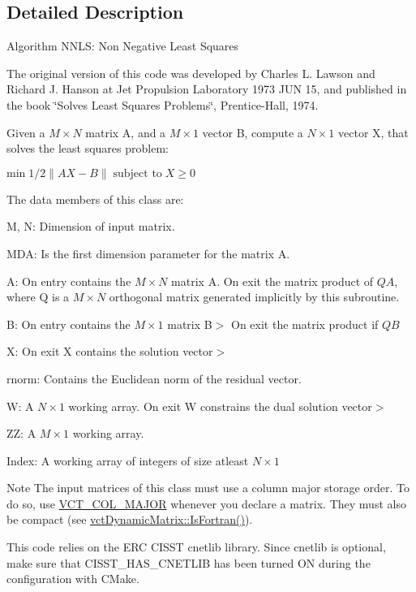 \subsection{Detailed Description}
Algorithm N\-N\-L\-S\-: Non Negative Least Squares

The original version of this code was developed by Charles L. Lawson and Richard J. Hanson at Jet Propulsion Laboratory 1973 J\-U\-N 15, and published in the book \char`\"{}\-Solves Least Squares Problems\char`\"{}, Prentice-\/\-Hall, 1974.

Given a $ M \times N$ matrix A, and a $ M \times 1 $ vector B, compute a $ N \times 1 $ vector X, that solves the least squares problem\-:

$ \mbox{min} \; 1 / 2 \| AX - B \| \; \mbox{subject to} \; X \geq 0$

The data members of this class are\-:
\begin{DoxyItemize}
\item M, N\-: Dimension of input matrix.
\item M\-D\-A\-: Is the first dimension parameter for the matrix A.
\item A\-: On entry contains the $ M \times N $ matrix A. On exit the matrix product of $ QA $, where Q is a $ M \times N $ orthogonal matrix generated implicitly by this subroutine.
\item B\-: On entry contains the $ M \times 1 $ matrix B$>$ On exit the matrix product if $ QB $
\item X\-: On exit X contains the solution vector$>$
\item rnorm\-: Contains the Euclidean norm of the residual vector.
\item W\-: A $ N \times 1 $ working array. On exit W constrains the dual solution vector$>$
\item Z\-Z\-: A $ M \times 1 $ working array.
\item Index\-: A working array of integers of size atleast $ N \times 1 $
\end{DoxyItemize}

\begin{DoxyNote}{Note}
The input matrices of this class must use a column major storage order. To do so, use \hyperlink{vct_forward_declarations_8h_a432cdf8923afaf82f551450ad4034746}{V\-C\-T\-\_\-\-C\-O\-L\-\_\-\-M\-A\-J\-O\-R} whenever you declare a matrix. They must also be compact (see \hyperlink{classvct_dynamic_const_matrix_base_aac5f19015b4888f760f99daa4bac199c}{vct\-Dynamic\-Matrix\-::\-Is\-Fortran()}).

This code relies on the E\-R\-C C\-I\-S\-S\-T cnetlib library. Since cnetlib is optional, make sure that C\-I\-S\-S\-T\-\_\-\-H\-A\-S\-\_\-\-C\-N\-E\-T\-L\-I\-B has been turned O\-N during the configuration with C\-Make. 
\end{DoxyNote}


